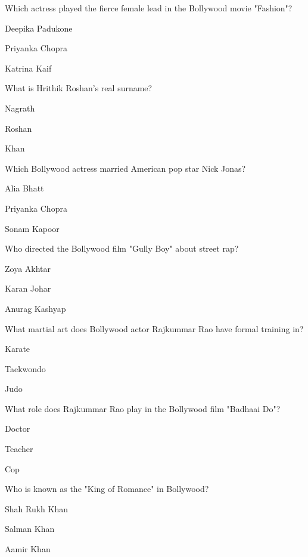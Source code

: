 \begin{enhancedmcq}{Which actress played the fierce female lead in the Bollywood movie "Fashion"?}
\item Deepika Padukone
\item Priyanka Chopra
\item Katrina Kaif

\end{enhancedmcq}
\begin{enhancedmcq}{What is Hrithik Roshan's real surname?}
\item Nagrath
\item Roshan
\item Khan

\end{enhancedmcq}
\begin{enhancedmcq}{Which Bollywood actress married American pop star Nick Jonas?}
\item Alia Bhatt
\item Priyanka Chopra
\item Sonam Kapoor

\end{enhancedmcq}
\begin{enhancedmcq}{Who directed the Bollywood film "Gully Boy" about street rap?}
\item Zoya Akhtar
\item Karan Johar
\item Anurag Kashyap

\end{enhancedmcq}
\begin{enhancedmcq}{What martial art does Bollywood actor Rajkummar Rao have formal training in?}
\item Karate
\item Taekwondo
\item Judo

\end{enhancedmcq}
\begin{enhancedmcq}{What role does Rajkummar Rao play in the Bollywood film "Badhaai Do"?}
\item Doctor
\item Teacher
\item Cop

\end{enhancedmcq}
\begin{enhancedmcq}{Who is known as the "King of Romance" in Bollywood?}
\item Shah Rukh Khan
\item Salman Khan
\item Aamir Khan

\end{enhancedmcq}
